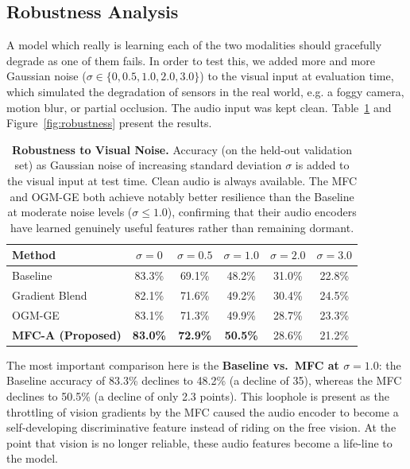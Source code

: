 \documentclass[fleqn,10pt]{wlscirep}
\begin{document}
\subsection{Robustness Analysis}

A model which really is learning each of the two modalities should gracefully degrade as one of them fails. In order to test this, we added more and more Gaussian noise ($\sigma \in \{0, 0.5, 1.0, 2.0, 3.0\}$) to the visual input at evaluation time, which simulated the degradation of sensors in the real world, e.g. a foggy camera, motion blur, or partial occlusion. The audio input was kept clean. Table~\ref{tab:robustness} and Figure~\ref{fig:robustness} present the results.

\begin{table}[h]
\caption{\textbf{Robustness to Visual Noise.} Accuracy (on the held-out validation set) as Gaussian noise of increasing standard deviation $\sigma$ is added to the visual input at test time. Clean audio is always available. The MFC and OGM-GE both achieve notably better resilience than the Baseline at moderate noise levels ($\sigma \leq 1.0$), confirming that their audio encoders have learned genuinely useful features rather than remaining dormant.}
\label{tab:robustness}
\centering
\begin{tabular}{@{}lccccc@{}}
\toprule
\textbf{Method} & $\sigma{=}0$ & $\sigma{=}0.5$ & $\sigma{=}1.0$ & $\sigma{=}2.0$ & $\sigma{=}3.0$ \\ \midrule
Baseline             & 83.3\% & 69.1\% & 48.2\% & 31.0\% & 22.8\% \\
Gradient Blend~\cite{wang2020makes} & 82.1\% & 71.6\% & 49.2\% & 30.4\% & 24.5\% \\
OGM-GE~\cite{peng2022balanced}     & 83.1\% & 71.3\% & 49.9\% & 28.7\% & 23.3\% \\
\textbf{MFC-A (Proposed)} & \textbf{83.0\%} & \textbf{72.9\%} & \textbf{50.5\%} & 28.6\% & 21.2\% \\
\bottomrule
\end{tabular}
\end{table}

The most important comparison here is the \textbf{Baseline vs.\ MFC at $\sigma = 1.0$}: the Baseline accuracy of 83.3\% declines to 48.2\% (a decline of 35), whereas the MFC declines to 50.5\% (a decline of only 2.3 points). This loophole is present as the throttling of vision gradients by the MFC caused the audio encoder to become a self-developing discriminative feature instead of riding on the free vision. At the point that vision is no longer reliable, these audio features become a life-line to the model.
\end{document}

